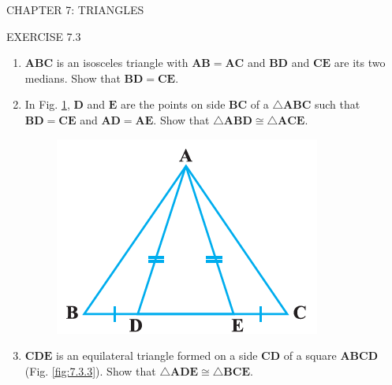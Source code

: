 \documentclass{article}
\let\vec\mathbf
\begin{document}
\begin{center}
	\color{blue} CHAPTER 7: TRIANGLES
\end{center}
\begin{center}
	\color{blue} EXERCISE 7.3
\end{center}

\begin{enumerate}
	\item $\vec{ABC}$ is an isosceles triangle with $\vec{AB=AC}$ and $\vec{BD}$ and $\vec{CE}$ are its two medians. Show that $\vec{BD=CE}$.
	\item In Fig. \ref{fig:7.3.2}, $\vec{D}$ and $\vec{E}$ are the points on side $\vec{BC}$ of a $\triangle \vec{ABC}$ such that $\vec{BD=CE}$ and $\vec{AD=AE}$. Show that $\triangle \vec{ABD} \cong \triangle \vec{ACE}$.
\begin{figure}[h]
	\centering
	\includegraphics[width=\columnwidth]{figs/Figure1.png}
	\caption{}
	\label{fig:7.3.2}
\end{figure}
\item $\vec{CDE}$ is an equilateral triangle formed on a side $\vec{CD}$ of a square $\vec{ABCD}$ (Fig. \ref{fig:7.3.3}). Show that $\triangle \vec{ADE} \cong \triangle \vec{BCE}$.
\begin{figure}[h]
	\centering

\end{figure}
\end{enumerate}
\end{document}

